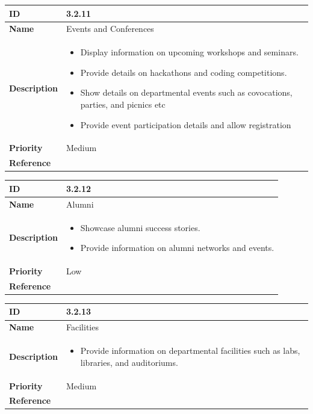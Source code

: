 \documentclass[11pt]{article}
\begin{document}
\begin{center}
\begin{tabular}{ | >{\bfseries}m{5em} | m{10cm} |  } 
  \hline
  ID & 3.2.11\\  
  \hline
  Name & Events and Conferences \\  
  \hline
  Description & 
  \begin{itemize}
      \item Display information on upcoming workshops and seminars.
      \item Provide details on hackathons and coding competitions.
      \item Show details on departmental events such as covocations, parties, and picnics etc
      \item Provide event participation details and allow registration
  \end{itemize} \\ 
  \hline
  Priority & Medium\\
  \hline 
  Reference & \\
  \hline
\end{tabular}
\end{center}

\vspace{0.5cm}


\begin{center}
\begin{tabular}{ | >{\bfseries}m{5em} | m{10cm} |  } 
  \hline
  ID & 3.2.12\\  
  \hline
  Name & Alumni \\  
  \hline
  Description & 
  \begin{itemize}
      \item Showcase alumni success stories.
      \item Provide information on alumni networks and events.
  \end{itemize} \\ 
  \hline
  Priority & Low\\
  \hline 
  Reference & \\
  \hline
\end{tabular}
\end{center}

\vspace{0.5cm}

\begin{center}
\begin{tabular}{ | >{\bfseries}m{5em} | m{10cm} |  } 
  \hline
  ID & 3.2.13\\  
  \hline
  Name & Facilities \\  
  \hline
  Description & 
  \begin{itemize}
      \item Provide information on departmental facilities such as labs, libraries, and auditoriums.
  \end{itemize} \\ 
  \hline
  Priority & Medium\\
  \hline 
  Reference & \\
  \hline
\end{tabular}
\end{center}
\end{document}
